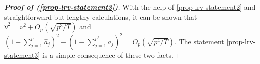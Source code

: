 \begin{proof}[\textnormal{\textbf{Proof of (\ref{prop-lrv-statement3})}}] 
With the help of \eqref{prop-lrv-statement2} and straightforward but lengthy calculations, it can be shown that $\widehat{\nu}^2 = \nu^2 + O_p(\sqrt{p^3/T})$ and $(1 - \sum_{j=1}^p \widehat{a}_j)^2 - (1 - \sum_{j=1}^{p^*} a_j)^2 = O_p(\sqrt{p^4/T})$. The statement \eqref{prop-lrv-statement3} is a simple consequence of these two facts.  
\end{proof}




